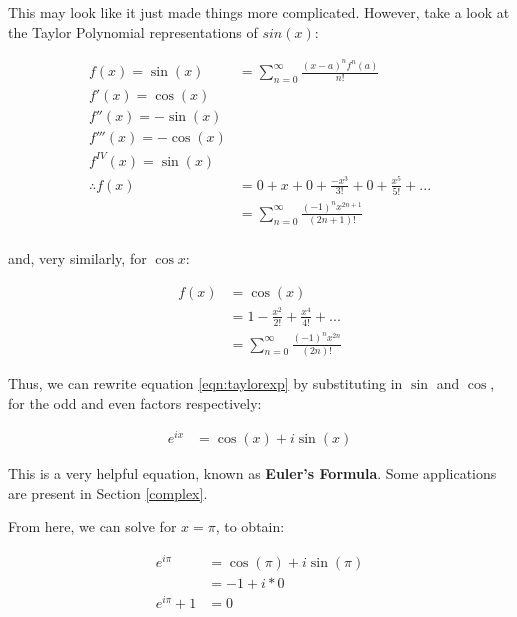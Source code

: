 \documentclass[12pt]{article}
\begin{document}
This may look like it just made things more complicated. However, take a look at the Taylor Polynomial representations of $sin(x)$:

\begin{equation}
    \begin{split}
        f(x) = \sin(x) &= \sum_{n=0}^{\infty} \frac{(x-a)^n f^n(a)}{n!}\\
        f'(x) = \cos(x)\\
        f''(x) = -\sin(x)\\
        f'''(x) = -\cos(x)\\
        f^{IV}(x) = \sin(x)\\
        \therefore f(x) &= 0 + x + 0 + \frac{-x^3}{3!} + 0 + \frac{x^5}{5!} + ...\\
        &= \sum_{n=0}^{\infty}\frac{(-1)^n x^{2n+1}}{(2n+1)!}\\
    \end{split}
\end{equation}

and, very similarly, for $\cos x$:

\begin{equation}
    \begin{split}
        f(x) &= \cos(x) \\
        &= 1 - \frac{x^2}{2!} + \frac{x^4}{4!} + ...\\
        &= \sum_{n=0}^{\infty} \frac{(-1)^n x^{2n}}{(2n)!}
    \end{split}
\end{equation}

Thus, we can rewrite equation \ref{eqn:taylorexp} by substituting in $\sin$ and $\cos$, for the odd and even factors respectively:

\begin{equation}
    \begin{split}
        e^{ix} &= \cos(x) + i\sin(x)
    \end{split}
\end{equation}

This is a very helpful equation, known as \textbf{Euler's Formula}. Some applications are present in Section \ref{complex}.

From here, we can solve for $x=\pi$, to obtain:

\begin{equation}
    \begin{split}
        e^{i\pi} &= \cos(\pi) + i \sin(\pi)\\
        &= -1 + i*0\\
        e^{i\pi}+1 &= 0
    \end{split}
\end{equation}
\end{document}
